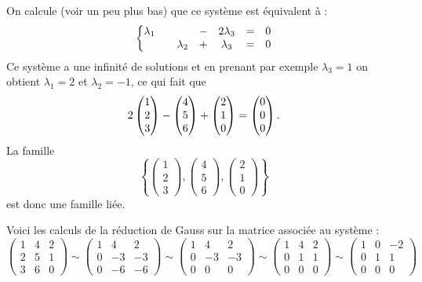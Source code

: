 \documentclass[class=report,crop=false]{standalone}
\begin{document}
\begin{exemple}
On calcule (voir un peu plus bas) que ce système est équivalent à :
$$\left \{ \begin{matrix}
\lambda_1&& &-&2 \lambda_{3}&=&0 \cr
&&\lambda_2&+&\lambda_{3}&=&0\cr
\end{matrix}\right .$$
Ce système a une infinité de solutions et en prenant par exemple $\lambda_3=1$
on obtient $\lambda_1=2$ et $\lambda_2=-1$, ce qui fait que
$$2\begin{pmatrix}
1\\2\\3
\end{pmatrix} -\begin{pmatrix}
4\\5\\6
\end{pmatrix} +\begin{pmatrix}
2\\1\\0
\end{pmatrix}=
\begin{pmatrix}0\cr 0\cr 0\cr \end{pmatrix}.$$
La famille
$$\left\{\begin{pmatrix}
1\\2\\3
\end{pmatrix},
\begin{pmatrix}
4\\5\\6
\end{pmatrix},
\begin{pmatrix}
2\\1\\0
\end{pmatrix}\right\}$$ est donc une famille liée.

Voici les calculs de la réduction de Gauss sur la matrice associée au système :
$$\begin{pmatrix}
1&4&2\\2&5&1\\3&6&0
\end{pmatrix}\sim
\begin{pmatrix}
1&4&2\\0&-3&-3\\0&-6&-6
\end{pmatrix}\sim
\begin{pmatrix}
1&4&2\\0&-3&-3\\0&0&0
\end{pmatrix}\sim
\begin{pmatrix}
1&4&2\\0&1&1\\0&0&0
\end{pmatrix}\sim
\begin{pmatrix}
1&0&-2\\0&1&1\\0&0&0
\end{pmatrix}$$
\end{exemple}
\end{document}
